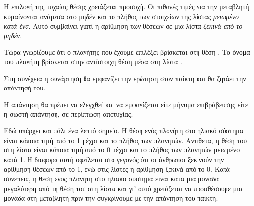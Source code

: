 \documentclass[a4paper,11pt,oneside]{book}
\begin{document}
Η επιλογή της τυχαίας θέσης χρειάζεται προσοχή. Οι πιθανές τιμές για την μεταβλητή  κυμαίνονται ανάμεσα στο μηδέν και το πλήθος των στοιχείων της λίστας \emph{μειωμένο κατά ένα}. Αυτό συμβαίνει γιατί η αρίθμηση των θέσεων σε μια λίστα \emph{ξεκινά από το μηδέν}.

Τώρα γνωρίζουμε ότι ο πλανήτης που έχουμε επιλέξει βρίσκεται στη θέση . Το όνομα του πλανήτη βρίσκεται στην αντίστοιχη θέση μέσα στη λίστα .


Στη συνέχεια η συνάρτηση θα εμφανίζει την ερώτηση στον παίκτη και θα ζητάει την απάντησή του.


Η απάντηση θα πρέπει να ελεγχθεί και να εμφανίζεται είτε μήνυμα επιβράβευσης είτε η σωστή απάντηση, σε περίπτωση αποτυχίας.



Εδώ υπάρχει και πάλι ένα λεπτό σημείο. Η θέση ενός πλανήτη στο ηλιακό σύστημα είναι κάποια τιμή από το 1 μέχρι και το πλήθος των πλανητών. Αντίθετα, η θέση του στη λίστα είναι κάποια τιμή από το 0 μέχρι και το πλήθος των πλανητών μειωμένο κατά 1. Η διαφορά αυτή οφείλεται στο γεγονός ότι οι άνθρωποι ξεκινούν την αρίθμηση θέσεων από το 1, ενώ στις λίστες η αρίθμηση ξεκινά από το 0. Κατά συνέπεια, η θέση ενός πλανήτη στο ηλιακό σύστημα είναι κατά μια μονάδα μεγαλύτερη από τη θέση του στη λίστα και γι' αυτό χρειάζεται να προσθέσουμε μια μονάδα στη μεταβλητή  πριν την συγκρίνουμε με την απάντηση  του παίκτη. 
\end{document}
